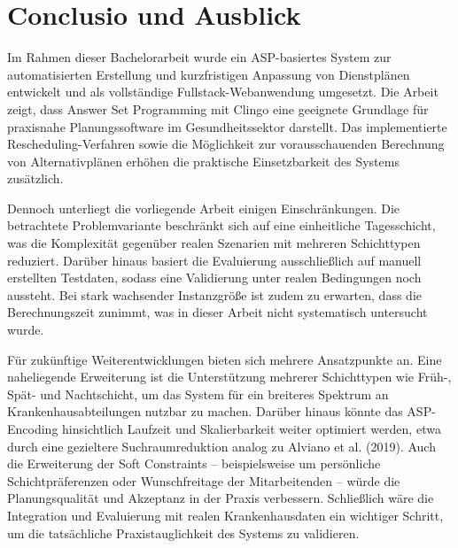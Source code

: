 
\chapter{Conclusio und Ausblick}

Im Rahmen dieser Bachelorarbeit wurde ein ASP-basiertes System zur automatisierten Erstellung und kurzfristigen Anpassung von Dienstplänen entwickelt und als vollständige Fullstack-Webanwendung umgesetzt. Die Arbeit zeigt, dass Answer Set Programming mit Clingo eine geeignete Grundlage für praxisnahe Planungssoftware im Gesundheitssektor darstellt. Das implementierte Rescheduling-Verfahren sowie die Möglichkeit zur vorausschauenden Berechnung von Alternativplänen erhöhen die praktische Einsetzbarkeit des Systems zusätzlich.

Dennoch unterliegt die vorliegende Arbeit einigen Einschränkungen. Die betrachtete Problemvariante beschränkt sich auf eine einheitliche Tagesschicht, was die Komplexität gegenüber realen Szenarien mit mehreren Schichttypen reduziert. Darüber hinaus basiert die Evaluierung ausschließlich auf manuell erstellten Testdaten, sodass eine Validierung unter realen Bedingungen noch aussteht. Bei stark wachsender Instanzgröße ist zudem zu erwarten, dass die Berechnungszeit zunimmt, was in dieser Arbeit nicht systematisch untersucht wurde.

Für zukünftige Weiterentwicklungen bieten sich mehrere Ansatzpunkte an. Eine naheliegende Erweiterung ist die Unterstützung mehrerer Schichttypen wie Früh-, Spät- und Nachtschicht, um das System für ein breiteres Spektrum an Krankenhausabteilungen nutzbar zu machen. Darüber hinaus könnte das ASP-Encoding hinsichtlich Laufzeit und Skalierbarkeit weiter optimiert werden, etwa durch eine gezieltere Suchraumreduktion analog zu Alviano et al. (2019). Auch die Erweiterung der Soft Constraints – beispielsweise um persönliche Schichtpräferenzen oder Wunschfreitage der Mitarbeitenden – würde die Planungsqualität und Akzeptanz in der Praxis verbessern. Schließlich wäre die Integration und Evaluierung mit realen Krankenhausdaten ein wichtiger Schritt, um die tatsächliche Praxistauglichkeit des Systems zu validieren.




